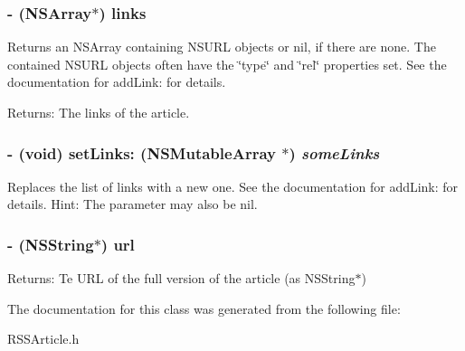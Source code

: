 \subsubsection{\setlength{\rightskip}{0pt plus 5cm}- (NSArray$\ast$) links }\label{interfaceRSSArticle_a11}


Returns an NSArray containing NSURL objects or nil, if there are none. The contained NSURL objects often have the \char`\"{}type\char`\"{} and \char`\"{}rel\char`\"{} properties set. See the documentation for add\-Link: for details.

\begin{Desc}
\item[Returns:]The links of the article.\end{Desc}
\subsubsection{\setlength{\rightskip}{0pt plus 5cm}- (void) set\-Links: (NSMutable\-Array $\ast$) {\em some\-Links}}\label{interfaceRSSArticle_a10}


Replaces the list of links with a new one. See the documentation for add\-Link: for details. Hint: The parameter may also be nil.
\subsubsection{\setlength{\rightskip}{0pt plus 5cm}- (NSString$\ast$) url }\label{interfaceRSSArticle_a7}


\begin{Desc}
\item[Returns:]Te URL of the full version of the article (as NSString$\ast$) \end{Desc}


The documentation for this class was generated from the following file:\begin{CompactItemize}
\item 
RSSArticle.h\end{CompactItemize}
